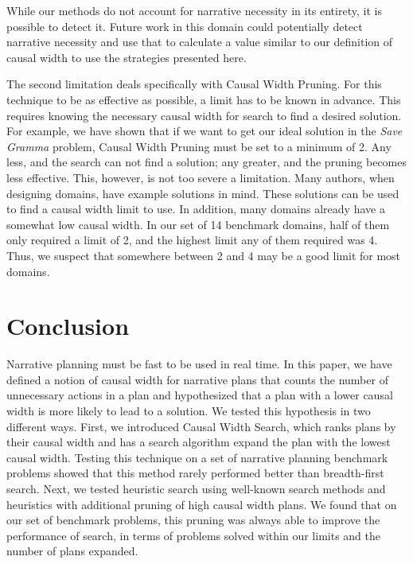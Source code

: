 \documentclass[letterpaper]{article} %
\begin{document}
While our methods do not account for narrative necessity in its entirety, it is possible to detect it. Future work in this domain could potentially detect narrative necessity and use that to calculate a value similar to our definition of causal width to use the strategies presented here. 

The second limitation deals specifically with Causal Width Pruning. For this technique to be as effective as possible, a limit has to be known in advance. This requires knowing the necessary causal width for search to find a desired solution. For example, we have shown that if we want to get our ideal solution in the \textit{Save Gramma} problem, Causal Width Pruning must be set to a minimum of 2. Any less, and the search can not find a solution; any greater, and the pruning becomes less effective. This, however, is not too severe a limitation. Many authors, when designing domains, have example solutions in mind. These solutions can be used to find a causal width limit to use. In addition, many domains already have a somewhat low causal width. In our set of 14 benchmark domains, half of them only required a limit of 2, and the highest limit any of them required was 4. Thus, we suspect that somewhere between 2 and 4 may be a good limit for most domains.

\section{Conclusion}

Narrative planning must be fast to be used in real time. In this paper, we have defined a notion of causal width for narrative plans that counts the number of unnecessary actions in a plan and hypothesized that a plan with a lower causal width is more likely to lead to a solution. We tested this hypothesis in two different ways. First, we introduced Causal Width Search, which ranks plans by their causal width and has a search algorithm expand the plan with the lowest causal width. Testing this technique on a set of narrative planning benchmark problems showed that this method rarely performed better than breadth-first search. Next, we tested heuristic search using well-known search methods and heuristics with additional pruning of high causal width plans. We found that on our set of benchmark problems, this pruning was always able to improve the performance of search, in terms of problems solved within our limits and the number of plans expanded. 
\end{document}
